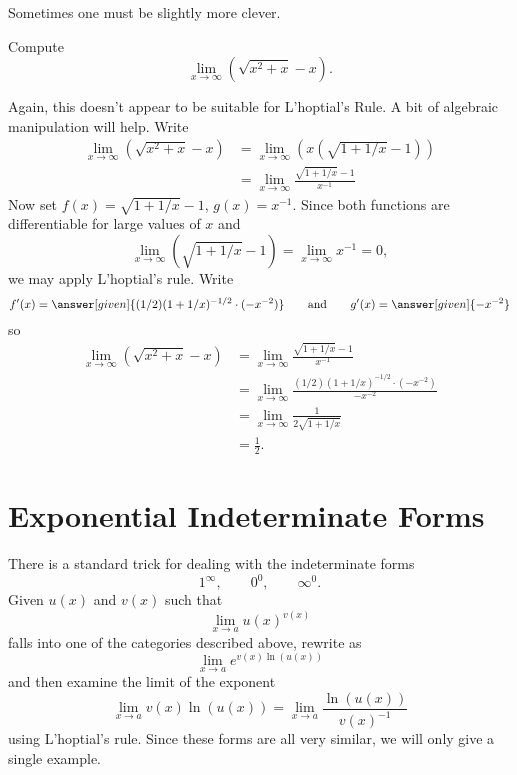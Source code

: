 \documentclass{ximera}
\begin{document}
Sometimes one must be slightly more clever. 

\begin{example}
Compute
\[
\lim_{x\to\infty}\left(\sqrt{x^2+x}-x\right).
\]
\begin{explanation}
Again, this doesn't appear to be suitable for L'hoptial's Rule. A bit of algebraic manipulation will help. Write
\begin{align*}
\lim_{x\to\infty}\left(\sqrt{x^2+x}-x\right) &= \lim_{x\to\infty}\left(x\left(\sqrt{1+1/x}-1\right)\right)\\
&=\lim_{x\to\infty}\frac{\sqrt{1+1/x}-1}{x^{-1}}
\end{align*}
Now set $f(x) = \sqrt{1+1/x}-1$, $g(x) = x^{-1}$. Since both
  functions are differentiable for large values of $x$ and 
\[
\lim_{x\to\infty} (\sqrt{1+1/x}-1) = \lim_{x\to\infty}x^{-1} = 0, 
\]
we may apply L'hoptial's rule. Write
\[
f'(x) = \answer[given]{(1/2)(1+1/x)^{-1/2}\cdot(-x^{-2})} \qquad \text{and}\qquad g'(x) = \answer[given]{-x^{-2}}
\]
so
\begin{align*}
\lim_{x\to\infty}\left(\sqrt{x^2+x}-x\right) &= \lim_{x\to\infty}\frac{\sqrt{1+1/x}-1}{x^{-1}} \\
&= \lim_{x\to\infty}\frac{(1/2)(1+1/x)^{-1/2}\cdot(-x^{-2})}{-x^{-2}} \\
&= \lim_{x\to\infty} \frac{1}{2\sqrt{1+1/x}}\\
&= \frac{1}{2}.
\end{align*}
\end{explanation}
\end{example}


\section{Exponential Indeterminate Forms}

There is a standard trick for dealing with the indeterminate forms
\[
1^\infty,\qquad 0^0,\qquad \infty^0.
\]
Given $u(x)$ and $v(x)$ such that
\[
\lim_{x\to a}u(x)^{v(x)}
\]
falls into one of the categories described above, rewrite as
\[
\lim_{x\to a}e^{v(x)\ln(u(x))}
\]
and then examine the limit of the exponent
\[
\lim_{x\to a} v(x)\ln(u(x)) = \lim_{x\to a} \frac{\ln(u(x))}{v(x)^{-1}}
\]
using L'hoptial's rule.  Since these forms are all very similar, we
will only give a single example.
\end{document}
